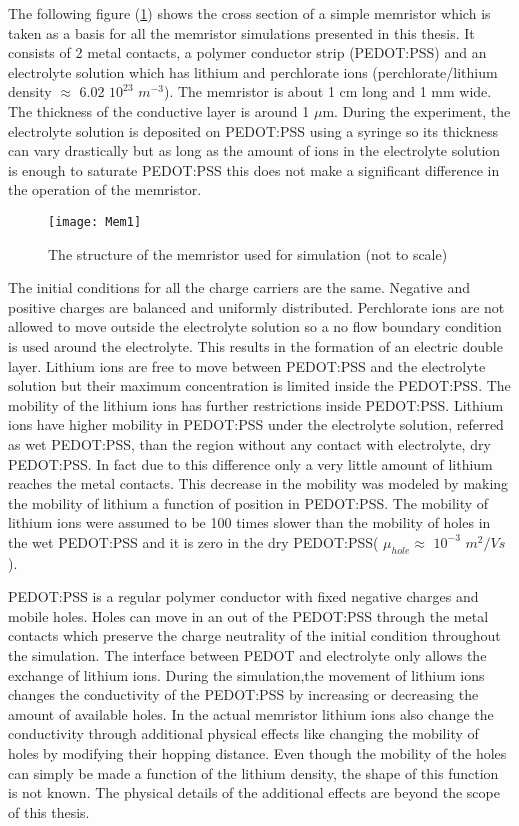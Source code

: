 \begin{doublespace}
The following figure (\ref{MemStc}) shows the cross section of a simple memristor which is taken as a basis for all the memristor simulations presented in this thesis. It consists of 2 metal contacts, a polymer conductor strip (PEDOT:PSS) and an electrolyte solution which has lithium and perchlorate ions (perchlorate/lithium density $\approx$ 6.02 $10^{23}$ $m^{-3}$). The memristor is about 1 cm long and 1 mm wide. The thickness of the conductive layer is around 1 $\mu$m. During the experiment, the electrolyte solution is deposited on PEDOT:PSS using a syringe so its thickness can vary drastically but as long as the amount of ions in the electrolyte solution is enough to saturate PEDOT:PSS this does not make a significant difference in the operation of the memristor.

\begin{figure}[!htp]
\centering
\texttt{[image: Mem1]}
\caption{The structure of the memristor used for simulation (not to scale)} 
\label{MemStc}
\end{figure}

The initial conditions for all the charge carriers are the same. Negative and positive charges are balanced and uniformly distributed. Perchlorate ions are not allowed to move outside the electrolyte solution so a no flow boundary condition is used around the electrolyte. This results in the formation of an electric double layer. Lithium ions are free to move between PEDOT:PSS and the electrolyte solution but their maximum concentration is limited inside the PEDOT:PSS. The mobility of the lithium ions has further restrictions inside PEDOT:PSS. Lithium ions have higher mobility in PEDOT:PSS under the electrolyte solution, referred as wet PEDOT:PSS, than the region without any contact with electrolyte, dry PEDOT:PSS. In fact due to this difference only a very little amount of lithium reaches the metal contacts. This decrease in the mobility was modeled by making the mobility of lithium a function of position in PEDOT:PSS. The mobility of lithium ions were assumed to be 100 times slower than the mobility of holes in the wet PEDOT:PSS and it is zero in the dry PEDOT:PSS( $\mu_{hole} \approx$ $10^{-3}$ $m^2/Vs$). 

PEDOT:PSS is a regular polymer conductor with fixed negative charges and mobile holes. Holes can move in an out of the PEDOT:PSS through the metal contacts which preserve the charge neutrality of the initial condition throughout the simulation. The interface between PEDOT and electrolyte only allows the exchange of lithium ions. During the simulation,the movement of lithium ions changes the conductivity of the PEDOT:PSS by increasing or decreasing the amount of available holes. In the actual memristor lithium ions also change the conductivity through additional physical effects like changing the mobility of holes by modifying their hopping distance. Even though the mobility of the holes can simply be made a function of the lithium density, the shape of this function is not known. The physical details of the additional effects are beyond the scope of this thesis. 


\end{doublespace}
